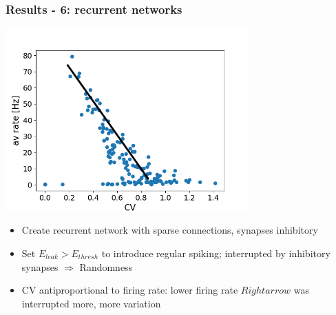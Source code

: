 \documentclass{beamer}
\begin{document}
\begin{frame}
	\frametitle{Results - 6: recurrent networks}
	\centering
	\includegraphics[width=0.7\textwidth]{figures/rate_CV.png}


	\begin{itemize}
		\item Create recurrent network with sparse connections, synapses inhibitory
		\item Set $E_{leak} > E_{thresh}$ to introduce regular spiking; interrupted 
		by inhibitory synapses $\Rightarrow$ Randomness
		\item CV antiproportional to firing rate: lower firing rate $Rightarrow$ was 
		interrupted more,  more variation
	\end{itemize}
	
\end{frame}
\end{document}
